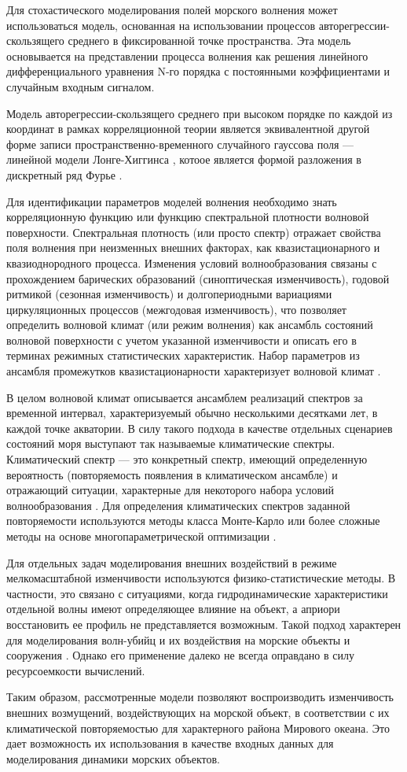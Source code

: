 Для стохастического моделирования полей морского волнения может использоваться модель, основанная на использовании процессов авто\-регрессии-скользящего среднего \citep{p295I_31} в фиксированной точке пространства. Эта модель основывается на представлении процесса волнения как решения линейного дифференциального уравнения N-го порядка с постоянными коэффициентами и случайным входным сигналом.

Модель авто\-регрессии-скользящего среднего при высоком порядке по каждой из координат в рамках корреляционной теории является эквивалентной другой форме записи пространственно-временного случайного гауссова поля --- линейной модели Лонге-Хиггинса \citep{p295I_45}, котоое является формой разложения в дискретный ряд Фурье \citep{krogstad89}.

Для идентификации параметров моделей волнения необходимо знать корреляционную функцию или функцию спектральной плотности волновой поверхности. Спектральная плотность (или просто спектр) отражает свойства поля волнения при неизменных внешних факторах, как квазистационарного и квазиоднородного процесса. Изменения условий волнообразования связаны с прохождением барических образований (синоптическая изменчивость), годовой ритмикой (сезонная изменчивость) и долгопериодными вариациями циркуляционных процессов (межгодовая изменчивость), что позволяет определить волновой климат (или режим волнения) как ансамбль состояний волновой поверхности с учетом указанной изменчивости и описать его в терминах режимных статистических характеристик. Набор параметров из ансамбля промежутков квазистационарности характеризует волновой климат \citep{dk4}.

В целом волновой климат описывается ансамблем реализаций спектров за временной интервал, характеризуемый обычно несколькими десятками лет, в каждой точке  акватории. В силу такого подхода в качестве отдельных сценариев состояний моря выступают так называемые климатические спектры. Климатический спектр — это конкретный спектр, имеющий определенную вероятность (повторяемость появления в климатическом ансамбле) и отражающий ситуации, характерные для некоторого набора условий волнообразования \citep{dk4}. Для определения климатических спектров заданной повторяемости используются методы класса Монте-Карло \citep{dk8} или более сложные методы на основе многопараметрической оптимизации  \citep{dk5}.

Для отдельных задач моделирования внешних воздействий в режиме мелкомасштабной изменчивости используются физико-статистические методы. В частности, это связано с ситуациями, когда гидродинамические характеристики отдельной волны имеют определяющее влияние на объект, а априори восстановить ее профиль не представляется возможным. Такой подход характерен для моделирования волн-убийц и их воздействия на морские объекты и сооружения \citep{dk12}\citep{dk13}. Однако его применение далеко не всегда оправдано в силу ресурсоемкости вычислений.

Таким образом, рассмотренные модели позволяют воспроизводить изменчивость внешних возмущений, воздействующих на морской объект, в соответствии с их климатической повторяемостью для характерного района Мирового океана. Это дает возможность их использования в качестве входных данных для моделирования динамики морских объектов.